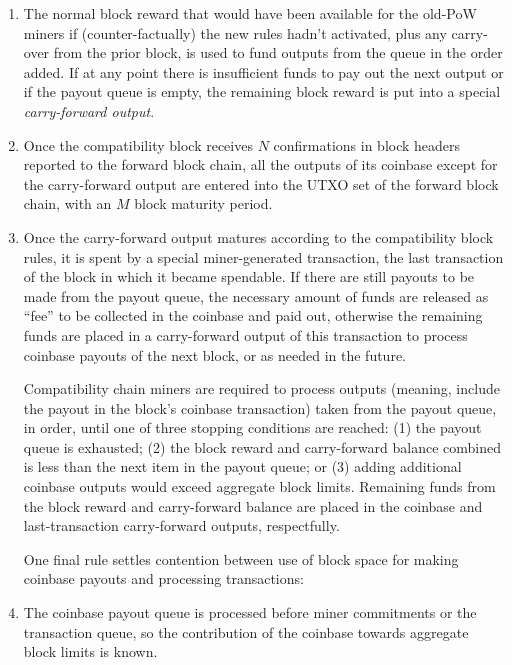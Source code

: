 \begin{enumerate}
  \item
    The normal block reward that would have been available for the
    old-PoW miners if (counter-factually) the new rules hadn't
    activated, plus any carry-over from the prior block, is used to
    fund outputs from the queue in the order added.  If at any point
    there is insufficient funds to pay out the next output or if the
    payout queue is empty, the remaining block reward is put into a
    special \emph{carry-forward output}.

  \item
    Once the compatibility block receives $N$ confirmations in block
    headers reported to the forward block chain, all the outputs of
    its coinbase except for the carry-forward output are entered into
    the UTXO set of the forward block chain, with an $M$ block
    maturity period.

  \item
    Once the carry-forward output matures according to the
    compatibility block rules, it is spent by a special
    miner-generated transaction, the last transaction of the block in
    which it became spendable.  If there are still payouts to be made
    from the payout queue, the necessary amount of funds are released
    as ``fee'' to be collected in the coinbase and paid out, otherwise
    the remaining funds are placed in a carry-forward output of this
    transaction to process coinbase payouts of the next block, or as
    needed in the future.

Compatibility chain miners are required to process outputs (meaning,
include the payout in the block's coinbase transaction) taken from the
payout queue, in order, until one of three stopping conditions are
reached: (1) the payout queue is exhausted; (2) the block reward and
carry-forward balance combined is less than the next item in the
payout queue; or (3) adding additional coinbase outputs would exceed
aggregate block limits.  Remaining funds from the block reward and
carry-forward balance are placed in the coinbase and last-transaction
carry-forward outputs, respectfully.

One final rule settles contention between use of block space for
making coinbase payouts and processing transactions:

  \item
    The coinbase payout queue is processed before miner commitments or
    the transaction queue, so the contribution of the coinbase towards
    aggregate block limits is known.
\end{enumerate}

